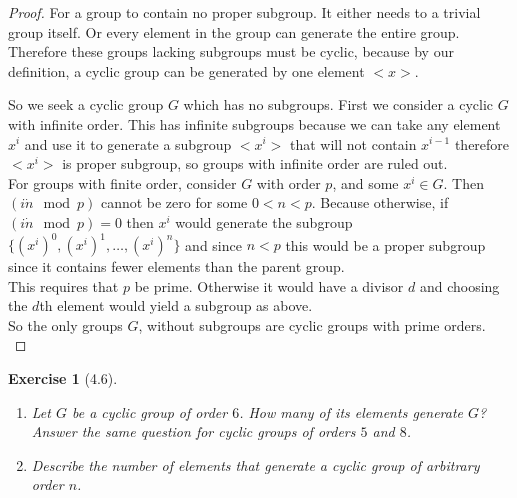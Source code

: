 \documentclass[12pt,leqno]{article}
\numberwithin{equation}{section}
\newtheorem*{exer}{Exercise}
\theoremstyle{definition}
\begin{document}
\begin{proof}[Proof]

    For a group to contain no proper subgroup. It either needs to a trivial
    group itself. Or every element in the group can generate the entire group.
    Therefore these groups lacking subgroups must be cyclic, because by our
    definition, a cyclic group can be generated by one element $<x>$.

    So we seek a cyclic group $G$ which has no subgroups. First we consider a
    cyclic $G$ with infinite order. This has infinite subgroups because we can
    take any element $x^i$ and use it to generate a subgroup $<x^i>$ that will
    not contain $x^{i-1}$ therefore $<x^i>$ is proper subgroup, so groups with
    infinite order are ruled out.  \hfill  \\

    For groups with finite order, consider $G$ with order $p$, and some $x^i
    \in G$.  Then $(i \dot n \mod p)$ cannot be zero for some $0 < n < p$.
    Because otherwise, if $(i \dot n \mod p) = 0$ then $x^i$ would generate the
    subgroup $ \{(x^i)^0, (x^i)^1, \dots, (x^i)^n \} $ and since $n < p$ this
    would be a proper subgroup since it contains fewer elements than the parent
    group.  \hfill \\

    This requires that $p$ be prime. Otherwise it would have a divisor $d$ and 
    choosing the $d$th element would yield a subgroup as above. 
    \hfill \\

    So the only groups $G$, without subgroups are cyclic groups with prime orders.
    \hfill \\

\end{proof}

\begin{exer}[4.6] 
\begin{enumerate}
\item[(a)] Let $G$ be a cyclic group of order $6$. How many of its elements generate $G$? Answer the same question for cyclic groups of orders $5$ and $8$.
\item[(b)] Describe the number of elements that generate a cyclic group of arbitrary order $n$.
\end{enumerate}

\end{exer}
\end{document}
